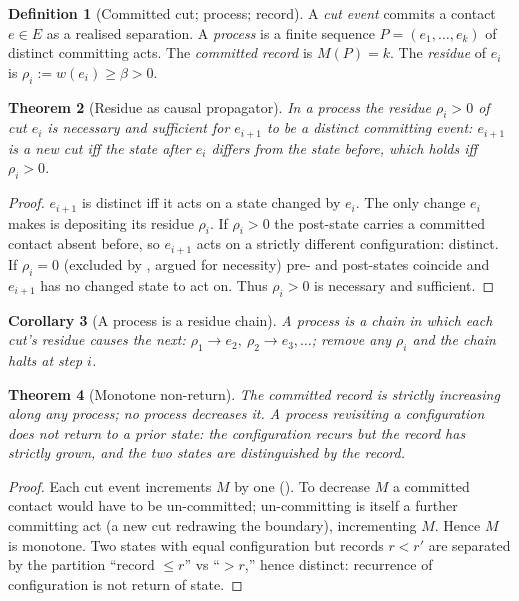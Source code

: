 \documentclass[twocolumn,11pt,a4paper]{article}
\theoremstyle{sup}
\newtheorem{theorem}{Theorem}[section]
\newtheorem{corollary}[theorem]{Corollary}
\theoremstyle{definition}
\newtheorem{definition}[theorem]{Definition}
\theoremstyle{remark}
\newcommand{\E}{E}
\newcommand{\wt}{w}
\newcommand{\flo}{\beta}
\newcommand{\res}{\rho}
\newcommand{\rec}{M}
\begin{document}
\begin{definition}[Committed cut; process; record]
\label{def:process}
A \emph{cut event} commits a contact $e\in\E$ as a realised separation. A
\emph{process} is a finite sequence $P=(e_1,\dots,e_k)$ of distinct committing
acts. The \emph{committed record} is $\rec(P)=k$. The \emph{residue} of $e_i$ is
$\res_i:=\wt(e_i)\ge\flo>0$.
\end{definition}

\begin{theorem}[Residue as causal propagator]
\label{thm:propagator}
In a process the residue $\res_i>0$ of cut $e_i$ is necessary and sufficient for
$e_{i+1}$ to be a distinct committing event: $e_{i+1}$ is a new cut iff the state
after $e_i$ differs from the state before, which holds iff $\res_i>0$.
\end{theorem}

\begin{proof}
$e_{i+1}$ is distinct iff it acts on a state changed by $e_i$. The only change
$e_i$ makes is depositing its residue $\res_i$. If $\res_i>0$ the post-state
carries a committed contact absent before, so $e_{i+1}$ acts on a strictly
different configuration: distinct. If $\res_i=0$ (excluded by ,
argued for necessity) pre- and post-states coincide and $e_{i+1}$ has no changed
state to act on. Thus $\res_i>0$ is necessary and sufficient.
\end{proof}

\begin{corollary}[A process is a residue chain]
\label{cor:chain}
A process is a chain in which each cut's residue causes the next:
$\res_1\to e_2,\ \res_2\to e_3,\dots$; remove any $\res_i$ and the chain halts
at step $i$.
\end{corollary}

\begin{theorem}[Monotone non-return]
\label{thm:monotone}
The committed record is strictly increasing along any process; no process
decreases it. A process revisiting a configuration does not return to a prior
state: the configuration recurs but the record has strictly grown, and the two
states are distinguished by the record.
\end{theorem}

\begin{proof}
Each cut event increments $\rec$ by one (). To decrease $\rec$
a committed contact would have to be un-committed; un-committing is itself a
further committing act (a new cut redrawing the boundary), incrementing $\rec$.
Hence $\rec$ is monotone. Two states with equal configuration but records
$r<r'$ are separated by the partition ``record $\le r$'' vs ``$>r$,'' hence
distinct: recurrence of configuration is not return of state.
\end{proof}
\end{document}
